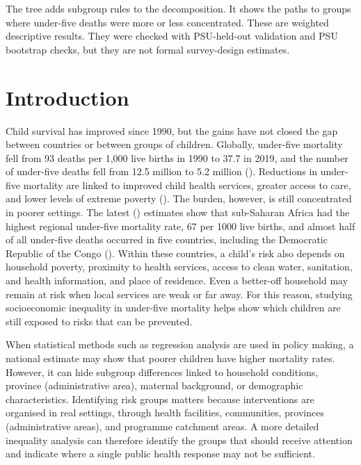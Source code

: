 \documentclass[
  11pt,
  a4paper,
]{article}
\begin{document}
The tree adds subgroup rules to the decomposition. It shows the paths to
groups where under-five deaths were more or less concentrated. These are
weighted descriptive results. They were checked with PSU-held-out
validation and PSU bootstrap checks, but they are not formal
survey-design estimates.

\section{Introduction}\label{sec-introduction}

Child survival has improved since 1990, but the gains have not closed
the gap between countries or between groups of children. Globally,
under-five mortality fell from 93 deaths per 1,000 live births in 1990
to 37.7 in 2019, and the number of under-five deaths fell from 12.5
million to 5.2 million
(). Reductions in under-five mortality are linked to improved child
health services, greater access to care, and lower levels of extreme
poverty (). The burden, however, is still concentrated in poorer settings.
The latest () estimates show that sub-Saharan Africa had
the highest regional under-five mortality rate, 67 per 1000 live births,
and almost half of all under-five deaths occurred in five countries,
including the Democratic Republic of the Congo
(). Within these countries, a child's risk also depends on household
poverty, proximity to health services, access to clean water,
sanitation, and health information, and place of residence. Even a
better-off household may remain at risk when local services are weak or
far away. For this reason, studying socioeconomic inequality in
under-five mortality helps show which children are still exposed to
risks that can be prevented.

When statistical methods such as regression analysis are used in policy
making, a national estimate may show that poorer children have higher
mortality rates. However, it can hide subgroup differences linked to
household conditions, province (administrative area), maternal
background, or demographic characteristics. Identifying risk groups
matters because interventions are organised in real settings, through
health facilities, communities, provinces (administrative areas), and
programme catchment areas. A more detailed inequality analysis can
therefore identify the groups that should receive attention and indicate
where a single public health response may not be sufficient.
\end{document}
